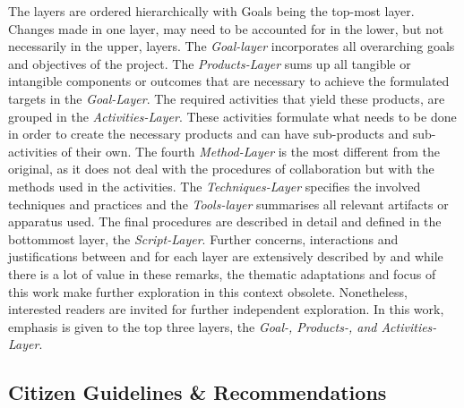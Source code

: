 The layers are ordered hierarchically with Goals being the top-most layer. Changes made in one layer, may need to be accounted for in the lower, but not necessarily in the upper, layers. The \textit{Goal-layer} incorporates all overarching goals and objectives of the project. The \textit{Products-Layer} sums up all tangible or intangible components or outcomes that are necessary to achieve the formulated targets in the \textit{Goal-Layer}. The required activities that yield these products, are grouped in the \textit{Activities-Layer}. These activities formulate what needs to be done in order to create the necessary products and can have sub-products and sub-activities of their own. The fourth \textit{Method-Layer} is the most different from the original, as it does not deal with the procedures of collaboration but with the methods used in the activities. The \textit{Techniques-Layer} specifies the involved techniques and practices and the \textit{Tools-layer} summarises all relevant artifacts or apparatus used. The final procedures are described in detail and defined in the bottommost layer, the \textit{Script-Layer}. Further concerns, interactions and justifications between and for each layer are extensively described by \autocite{briggsSevenLayerModelCollaboration2009} and while there is a lot of value in these remarks, the thematic adaptations and focus of this work make further exploration in this context obsolete. Nonetheless, interested readers are invited for further independent exploration. In this work, emphasis is given to the top three layers, the \textit{Goal-, Products-, and Activities-Layer}.

\subsection{Citizen Guidelines \& Recommendations}

